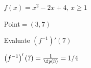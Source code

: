 {$f(x) = x^2-2x+4$, $x\geq 1$

Point$=(3,7)$ 

Evaluate $\left(f^{-1}\right)'(7)$}
{$\left(f^{-1}\right)'(7) = \frac{1}{\fp(3)} = 1/4$
}
